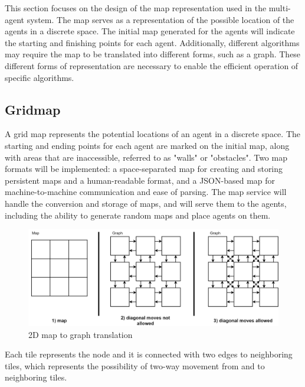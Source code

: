 This section focuses on the design of the map representation used in the multi-agent system. The map serves as a representation of the possible location of the agents in a discrete space. The initial map generated for the agents will indicate the starting and finishing points for each agent. Additionally, different algorithms may require the map to be translated into different forms, such as a graph. These different forms of representation are necessary to enable the efficient operation of specific algorithms. 

\subsection{Gridmap}
A grid map represents the potential locations of an agent in a discrete space. The starting and ending points for each agent are marked on the initial map, along with areas that are inaccessible, referred to as "walls" or "obstacles". Two map formats will be implemented: a space-separated map for creating and storing persistent maps and a human-readable format, and a JSON-based map for machine-to-machine communication and ease of parsing. The map service will handle the conversion and storage of maps, and will serve them to the agents, including the ability to generate random maps and place agents on them.

\begin{figure}[H]
    \centering
    \includegraphics[width=\textwidth]{pictures/map_2d.png}
    \caption{2D map to graph translation}
    \label{fig:map_2D}
\end{figure}

Each tile represents the node and it is connected with two edges to neighboring tiles, which represents the possibility of two-way movement from and to neighboring tiles. 


